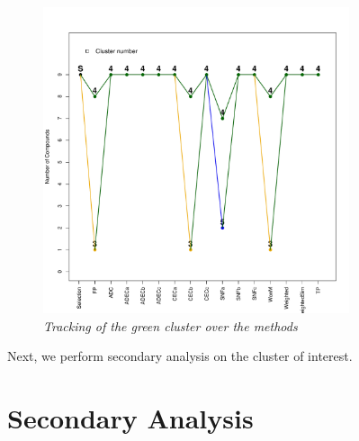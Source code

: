 \documentclass[a4paper]{article}
\begin{document}
\vspace{-1.0cm}
\begin{figure}[H]
\centering
\includegraphics[width=9cm,height=9cm]{Tracking.pdf}
\caption{{\it Tracking of the green cluster over the
methods}\label{MCF7_Weights}}
\end{figure}
\noindent Next, we perform secondary analysis on the cluster of interest.
\newpage
\section{Secondary Analysis}
\end{document}
